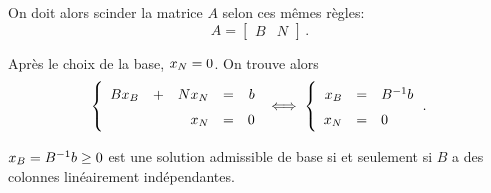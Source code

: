 	On doit alors scinder la matrice $A$ selon ces mêmes règles:
	\[
	A
	=
	\begin{bmatrix}
		B & N
	\end{bmatrix}\,.
	\]

	Après le choix de la base, $x_N = 0$.
	On trouve alors
	\[
	\renewcommand{\arraystretch}{1.5}
	\left\{
	\begin{array}{rcrcr}
		B \xb & + & N \xn & = & b\\
		      &   &   \xn & = & 0
	\end{array}
	\right.
	\iff
	\left\{
	\begin{array}{rcl}
		\xb & = & B^{-1} b\\
		\xn & = & 0
	\end{array}\,.
	\right.
	\]

	$x_B = B^{-1} b \ge 0$ est une solution admissible de base
	si et seulement si
	$B$ a des colonnes linéairement indépendantes.
